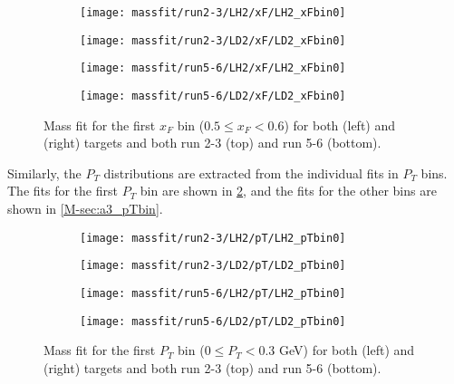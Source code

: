 \documentclass[../main.tex]{subfiles}
\begin{document}
\begin{figure}[h!]
	\centering
	\begin{subfigure}{0.48\linewidth}
		\texttt{[image: massfit/run2-3/LH2/xF/LH2\_xFbin0]}
	\end{subfigure}
	\begin{subfigure}{0.48\linewidth}
		\texttt{[image: massfit/run2-3/LD2/xF/LD2\_xFbin0]}
	\end{subfigure}
	\begin{subfigure}{0.48\linewidth}
		\texttt{[image: massfit/run5-6/LH2/xF/LH2\_xFbin0]}
	\end{subfigure}
	\begin{subfigure}{0.48\linewidth}
		\texttt{[image: massfit/run5-6/LD2/xF/LD2\_xFbin0]}
	\end{subfigure}
	\caption{Mass fit for the first $x_F$ bin ($0.5\leq x_F<0.6$) for both  (left) and  (right) targets
		and both run 2-3 (top) and run 5-6 (bottom). }
	\label{fig:massfit_1st_xF}
\end{figure}
Similarly, the $P_T$ distributions are extracted from the individual fits in $P_T$ bins.
The fits for the first $P_T$ bin are shown in \cref{fig:massfit_1st_pT},
and the fits for the other bins are shown in \cref{M-sec:a3_pTbin}.
\begin{figure}[h!]
	\centering
	\begin{subfigure}{0.48\linewidth}
		\texttt{[image: massfit/run2-3/LH2/pT/LH2\_pTbin0]}
	\end{subfigure}
	\begin{subfigure}{0.48\linewidth}
		\texttt{[image: massfit/run2-3/LD2/pT/LD2\_pTbin0]}
	\end{subfigure}
	\begin{subfigure}{0.48\linewidth}
		\texttt{[image: massfit/run5-6/LH2/pT/LH2\_pTbin0]}
	\end{subfigure}
	\begin{subfigure}{0.48\linewidth}
		\texttt{[image: massfit/run5-6/LD2/pT/LD2\_pTbin0]}
	\end{subfigure}
	\caption{Mass fit for the first $P_T$ bin ($0\leq P_T<0.3$ \unit{\GeV}) for both  (left) and  (right) targets
		and both run 2-3 (top) and run 5-6 (bottom). }
	\label{fig:massfit_1st_pT}
\end{figure}
\FloatBarrier
\end{document}
